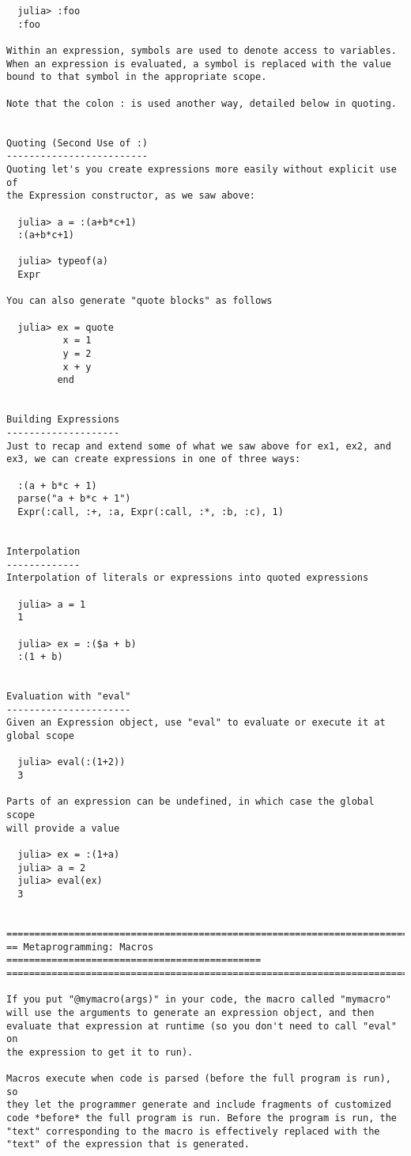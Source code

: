 \documentclass[12pt]{article}
\theoremstyle{plain}
\theoremstyle{definition}
\theoremstyle{remark}
\begin{document}
\begin{lstlisting}
  julia> :foo
  :foo

Within an expression, symbols are used to denote access to variables.
When an expression is evaluated, a symbol is replaced with the value
bound to that symbol in the appropriate scope.

Note that the colon : is used another way, detailed below in quoting.


Quoting (Second Use of :)
-------------------------
Quoting let's you create expressions more easily without explicit use of
the Expression constructor, as we saw above:

  julia> a = :(a+b*c+1)
  :(a+b*c+1)

  julia> typeof(a)
  Expr

You can also generate "quote blocks" as follows

  julia> ex = quote
          x = 1
          y = 2
          x + y
         end


Building Expressions
--------------------
Just to recap and extend some of what we saw above for ex1, ex2, and
ex3, we can create expressions in one of three ways:

  :(a + b*c + 1)
  parse("a + b*c + 1")
  Expr(:call, :+, :a, Expr(:call, :*, :b, :c), 1)


Interpolation
-------------
Interpolation of literals or expressions into quoted expressions

  julia> a = 1
  1

  julia> ex = :($a + b)
  :(1 + b)


Evaluation with "eval"
----------------------
Given an Expression object, use "eval" to evaluate or execute it at
global scope

  julia> eval(:(1+2))
  3

Parts of an expression can be undefined, in which case the global scope
will provide a value

  julia> ex = :(1+a)
  julia> a = 2
  julia> eval(ex)
  3


========================================================================
== Metaprogramming: Macros =============================================
========================================================================

If you put "@mymacro(args)" in your code, the macro called "mymacro"
will use the arguments to generate an expression object, and then
evaluate that expression at runtime (so you don't need to call "eval" on
the expression to get it to run).

Macros execute when code is parsed (before the full program is run), so
they let the programmer generate and include fragments of customized
code *before* the full program is run. Before the program is run, the
"text" corresponding to the macro is effectively replaced with the
"text" of the expression that is generated.


\end{lstlisting}
\end{document}
